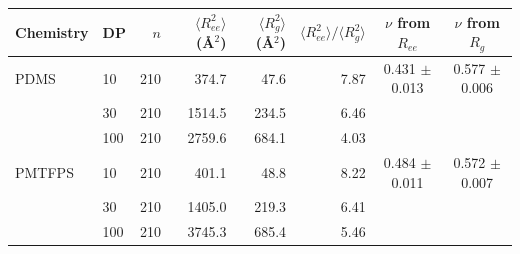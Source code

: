 \begin{tabular}{llrrrrcc}
\toprule
Chemistry & DP & $n$ & $\langle R_{ee}^2\rangle$ (\AA$^2$) & $\langle R_g^2\rangle$ (\AA$^2$) & $\langle R_{ee}^2\rangle/\langle R_g^2\rangle$ & $\nu$ from $R_{ee}$ & $\nu$ from $R_g$ \\
\midrule
PDMS & 10 & 210 & 374.7 & 47.6 & 7.87 & 0.431 $\pm$ 0.013 & 0.577 $\pm$ 0.006 \\
 & 30 & 210 & 1514.5 & 234.5 & 6.46 &  &  \\
 & 100 & 210 & 2759.6 & 684.1 & 4.03 &  &  \\
\midrule
PMTFPS & 10 & 210 & 401.1 & 48.8 & 8.22 & 0.484 $\pm$ 0.011 & 0.572 $\pm$ 0.007 \\
 & 30 & 210 & 1405.0 & 219.3 & 6.41 &  &  \\
 & 100 & 210 & 3745.3 & 685.4 & 5.46 &  &  \\
\bottomrule
\end{tabular}
